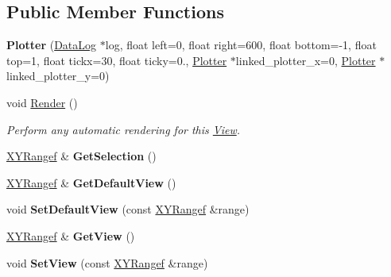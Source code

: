 \subsection*{Public Member Functions}
\begin{DoxyCompactItemize}
\item 
{\bfseries Plotter} (\hyperlink{classpangolin_1_1_data_log}{Data\+Log} $\ast$log, float left=0, float right=600, float bottom=-\/1, float top=1, float tickx=30, float ticky=0., \hyperlink{classpangolin_1_1_plotter}{Plotter} $\ast$linked\+\_\+plotter\+\_\+x=0, \hyperlink{classpangolin_1_1_plotter}{Plotter} $\ast$linked\+\_\+plotter\+\_\+y=0)\hypertarget{classpangolin_1_1_plotter_ad2fe719a5005597dabb043956775c683}{}\label{classpangolin_1_1_plotter_ad2fe719a5005597dabb043956775c683}

\item 
void \hyperlink{classpangolin_1_1_plotter_a362ca1771e2738997cd933e75512b5f0}{Render} ()
\begin{DoxyCompactList}\small\item\em Perform any automatic rendering for this \hyperlink{structpangolin_1_1_view}{View}. \end{DoxyCompactList}\item 
\hyperlink{structpangolin_1_1_x_y_range}{X\+Y\+Rangef} \& {\bfseries Get\+Selection} ()\hypertarget{classpangolin_1_1_plotter_a7e143d52c233acbe3511c578f735ff0c}{}\label{classpangolin_1_1_plotter_a7e143d52c233acbe3511c578f735ff0c}

\item 
\hyperlink{structpangolin_1_1_x_y_range}{X\+Y\+Rangef} \& {\bfseries Get\+Default\+View} ()\hypertarget{classpangolin_1_1_plotter_a0fb03d930eeb11d3cd496f523fc8054c}{}\label{classpangolin_1_1_plotter_a0fb03d930eeb11d3cd496f523fc8054c}

\item 
void {\bfseries Set\+Default\+View} (const \hyperlink{structpangolin_1_1_x_y_range}{X\+Y\+Rangef} \&range)\hypertarget{classpangolin_1_1_plotter_af36e68f055e90b7dd9f6b3a1a2af0c12}{}\label{classpangolin_1_1_plotter_af36e68f055e90b7dd9f6b3a1a2af0c12}

\item 
\hyperlink{structpangolin_1_1_x_y_range}{X\+Y\+Rangef} \& {\bfseries Get\+View} ()\hypertarget{classpangolin_1_1_plotter_a6364f82365a47c720ec1885167c34b2d}{}\label{classpangolin_1_1_plotter_a6364f82365a47c720ec1885167c34b2d}

\item 
void {\bfseries Set\+View} (const \hyperlink{structpangolin_1_1_x_y_range}{X\+Y\+Rangef} \&range)\hypertarget{classpangolin_1_1_plotter_a0db2927be2eff59b126afc49b38ef890}{}\label{classpangolin_1_1_plotter_a0db2927be2eff59b126afc49b38ef890}


\end{DoxyCompactItemize}
